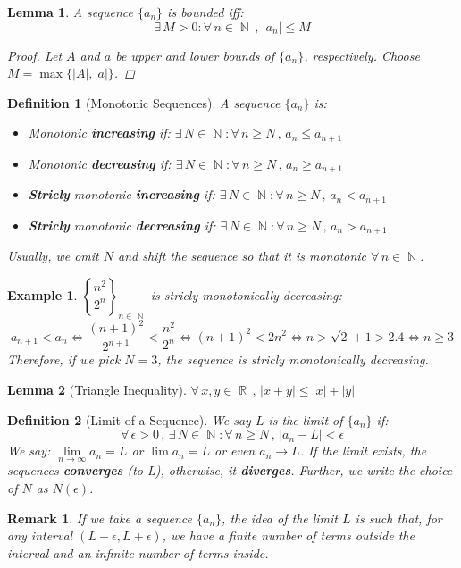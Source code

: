 \documentclass[12pt]{article}
\let\LR\Leftrightarrow
\newcommand{\Forall}[1]{\forall\,{#1}\,,\,}
\newcommand{\Exist}[1]{\exists\,{#1}:}
\newcommand{\seq}[2]{\left\{{#1}\right\}_{#2 \in\N}}
\DeclareMathOperator{\N}{\mathbb{N}}
\DeclareMathOperator{\R}{\mathbb{R}}
\newtheorem{definition}{Definition}[subsection]
\newtheorem{lemma}{Lemma}[subsection]
\newtheorem{example}{Example}[subsection]
\newtheorem{remark}{Remark}[subsection]
\begin{document}
\begin{lemma}
  A sequence $\{a_n\}$ is bounded iff: $$\Exist{M>0}\Forall{n\in\N}|a_n|\leq M$$
  \begin{proof}
    Let $A$ and $a$ be upper and lower bounds of $\{a_n\}$, respectively. Choose $M=\max\{|A|,|a|\}$.
  \end{proof}
\end{lemma}

\begin{definition}[Monotonic Sequences]
  A sequence $\{a_n\}$  is:
  \begin{itemize}
    \item[] Monotonic \textbf{increasing} if: $\Exist{N\in\N}\Forall{n\geq N}a_n\leq a_{n+1}$
    \item[] Monotonic \textbf{decreasing} if: $\Exist{N\in\N}\Forall{n\geq N}a_n\geq a_{n+1}$
    \item[] \textbf{Stricly} monotonic \textbf{increasing} if: $\Exist{N\in\N}\Forall{n\geq N}a_n < a_{n+1}$
    \item[] \textbf{Stricly} monotonic \textbf{decreasing} if: $\Exist{N\in\N}\Forall{n\geq N}a_n > a_{n+1}$
  \end{itemize}
  Usually, we omit $N$ and shift the sequence so that it is monotonic $\forall\,n\in\N$.
\end{definition}

\begin{example}
  $\seq{\dfrac{n^2}{2^n}}{n}$ is stricly monotonically decreasing:
$$a_{n+1}<a_n \LR \frac{(n+1)^2}{2^{n+1}}<\frac{n^2}{2^n}\LR (n+1)^2<2n^2 \LR n>\sqrt{2}+1>2.4 \LR n\geq 3$$
Therefore, if we pick $N=3$, the sequence is stricly monotonically decreasing.
\end{example}

\begin{lemma}[Triangle Inequality]
  $\Forall{x,y\in\R}|x+y|\leq |x|+|y|$
\end{lemma}

\begin{definition}[Limit of a Sequence]
  We say $L$ is the limit of $\{a_n\}$ if:
  $$\Forall{\epsilon>0}\Exist{N\in\N}\Forall{n\geq N} |a_n-L| <\epsilon$$
  We say: $\lim\limits_{n\to\infty}a_n=L$ or $\lim a_n=L$ or even $a_n\to L$. If the limit exists, the sequences \textbf{converges} (to L), otherwise, it \textbf{diverges}. Further, we write the choice of $N$ as $N(\epsilon)$.
\end{definition}

\begin{remark} If we take a sequence $\{a_n\}$, the idea of the limit $L$ is such that, for any interval $(L-\epsilon, L+\epsilon)$, we have a finite number of terms outside the interval and an infinite number of terms inside.
\end{remark}
\end{document}
